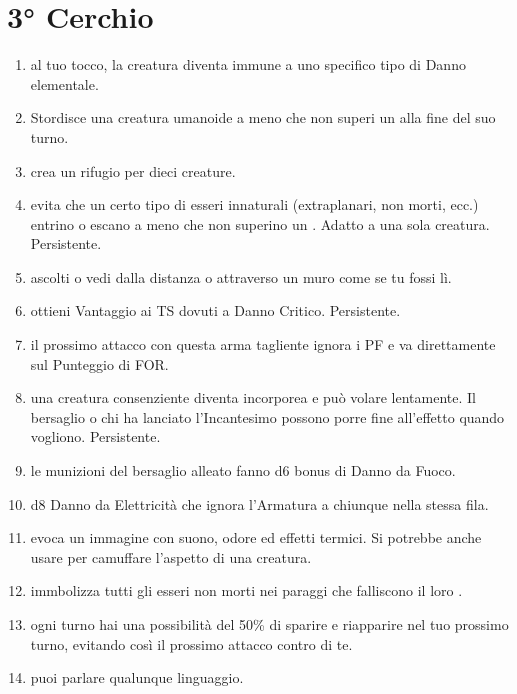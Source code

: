 \documentclass[itdr]{subfiles}
\begin{document}
\section{3° Cerchio}
\def \spellcircle {3}
\begin{enumerate}
	\item {} al tuo tocco, la creatura diventa immune a uno specifico tipo di Danno elementale.
	\item {} Stordisce una creatura umanoide a meno che non superi un  alla fine del suo turno.
	\item {} crea un rifugio per dieci creature.
	\item {} evita che un certo tipo di esseri innaturali (extraplanari, non morti, ecc.) entrino o escano a meno che non superino un . Adatto a una sola creatura. Persistente.
	\item {} ascolti o vedi dalla distanza o attraverso un muro come se tu fossi lì.
	\item {} ottieni Vantaggio ai TS dovuti a Danno Critico. Persistente.
	\item {} il prossimo attacco con questa arma tagliente ignora i PF e va direttamente sul Punteggio di FOR.
	\item {} una creatura consenziente diventa \mbox{incorporea} e può volare lentamente. Il bersaglio o chi ha lanciato l'Incantesimo possono porre fine all'effetto quando vogliono. Persistente.
	\item {} le munizioni del bersaglio alleato fanno d6 bonus di Danno da Fuoco.
	\item {} d8 Danno da Elettricità che ignora l'Armatura a chiunque nella stessa fila.
	\item {} evoca un immagine con suono, odore ed effetti termici. Si potrebbe anche usare per camuffare l'aspetto di una creatura.
	\item {} immbolizza tutti gli esseri non morti nei paraggi che falliscono il loro .
	\item {} ogni turno hai una possibilità del 50\% di sparire e riapparire nel tuo prossimo turno, evitando così il prossimo attacco contro di te.
	\item {} puoi parlare qualunque linguaggio.

\end{enumerate}
\end{document}
